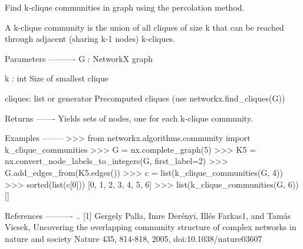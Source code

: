 \begin{DoxyVerb}Find k-clique communities in graph using the percolation method.

A k-clique community is the union of all cliques of size k that
can be reached through adjacent (sharing k-1 nodes) k-cliques.

Parameters
----------
G : NetworkX graph

k : int
   Size of smallest clique

cliques: list or generator
   Precomputed cliques (use networkx.find_cliques(G))

Returns
-------
Yields sets of nodes, one for each k-clique community.

Examples
--------
>>> from networkx.algorithms.community import k_clique_communities
>>> G = nx.complete_graph(5)
>>> K5 = nx.convert_node_labels_to_integers(G, first_label=2)
>>> G.add_edges_from(K5.edges())
>>> c = list(k_clique_communities(G, 4))
>>> sorted(list(c[0]))
[0, 1, 2, 3, 4, 5, 6]
>>> list(k_clique_communities(G, 6))
[]

References
----------
.. [1] Gergely Palla, Imre Derényi, Illés Farkas1, and Tamás Vicsek,
   Uncovering the overlapping community structure of complex networks
   in nature and society Nature 435, 814-818, 2005,
   doi:10.1038/nature03607
\end{DoxyVerb}
 